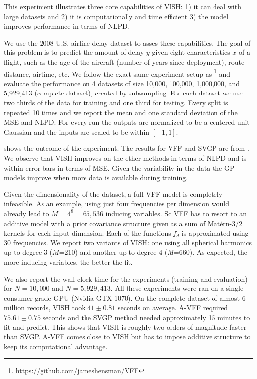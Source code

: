 This experiment illustrates three core capabilities of VISH: 1) it can deal with large datasets and 2) it is computationally and time efficient 3) the model improves performance in terms of NLPD.

We use the 2008 U.S. airline delay dataset to asses these capabilities. The goal of this problem is to predict the amount of delay $y$ given eight characteristics $x$ of a flight, such as the age of the aircraft (number of years since deployment), route distance, airtime, etc. We follow the exact same experiment setup as \citet{hensman2017variational}\footnote{\url{https://github.com/jameshensman/VFF}} and evaluate the performance on 4 datasets of size 10,000, 100,000, 1,000,000, and 5,929,413 (complete dataset), created by subsampling. For each dataset we use two thirds of the data for training and one third for testing. Every split is repeated 10 times and we report the mean and one standard deviation of the MSE and NLPD. For every run the outputs are normalized to be a centered unit Gaussian and the inputs are scaled to be within $[-1, 1]$.

 shows the outcome of the experiment. The results for VFF and SVGP are from \citet{hensman2017variational}. We observe that VISH improves on the other methods in terms of NLPD and is within error bars in terms of MSE. Given the variability in the data the GP models improve when more data is available during training.

Given the dimensionality of the dataset, a full-VFF model is completely infeasible. As an example, using just four frequencies per dimension would already lead to $M = 4^8 = 65,536$ inducing variables. So VFF has to resort to an additive model with a prior covariance structure given as a sum of Mat\'ern-3/2 kernels for each input dimension. Each of the functions $f_d$ is approximated using 30 frequencies.
We report two variants of VISH: one using all spherical harmonics up to degree 3 ($M$=210) and another up to degree 4 ($M$=660). As expected, the more inducing variables, the better the fit.

We also report the wall clock time for the experiments (training and evaluation) for $N=10,000$ and $N=5,929,413$. All these experiments were ran on a single consumer-grade GPU (Nvidia GTX 1070). On the complete dataset of almost 6 million records, VISH took $41\pm0.81$ seconds on average. A-VFF required $75.61\pm0.75$ seconds and the SVGP method needed approximately 15 minutes to fit and predict. This shows that VISH is roughly two orders of magnitude faster than SVGP. A-VFF comes close to VISH but has to impose additive structure to keep its computational advantage.


